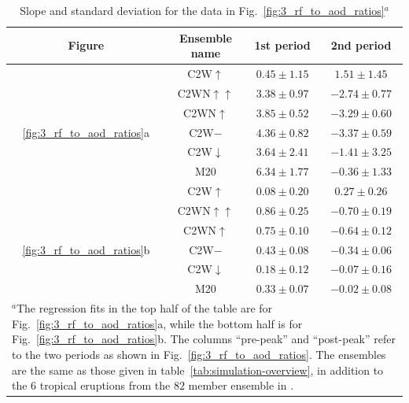 \documentclass[draft]{agujournal2019}
\newcommand{\cwm}{C2W\(\downarrow\)}
\newcommand{\cwmp}{C2W\(-\)}
\newcommand{\cws}{C2WN\(\uparrow\)}
\newcommand{\cwss}{C2WN\(\uparrow\uparrow\)}
\newcommand{\cwsn}{C2W\(\uparrow\)}
\begin{document}
\begin{table}
  \centering

  \caption{Slope and standard deviation for the data in
    Fig.~\ref{fig:3_rf_to_aod_ratios}\(^{a}\)}\label{tab:slope-gradients}%
  \begin{tabular}{cccc}
    \toprule
    Figure                        & Ensemble name & 1st period      & 2nd period       \\
    \midrule
                                  & \cwsn{}       & \(0.45\pm1.15\) & \(1.51\pm1.45\)  \\
                                  & \cwss{}       & \(3.38\pm0.97\) & \(-2.74\pm0.77\) \\
                                  & \cws{}        & \(3.85\pm0.52\) & \(-3.29\pm0.60\) \\
    \ref{fig:3_rf_to_aod_ratios}a & \cwmp{}       & \(4.36\pm0.82\) & \(-3.37\pm0.59\) \\
                                  & \cwm{}        & \(3.64\pm2.41\) & \(-1.41\pm3.25\) \\
                                  & M20           & \(6.34\pm1.77\) & \(-0.36\pm1.33\) \\
    \midrule
                                  & \cwsn{}       & \(0.08\pm0.20\) & \(0.27\pm0.26\)  \\
                                  & \cwss{}       & \(0.86\pm0.25\) & \(-0.70\pm0.19\) \\
                                  & \cws{}        & \(0.75\pm0.10\) & \(-0.64\pm0.12\) \\
    \ref{fig:3_rf_to_aod_ratios}b & \cwmp{}       & \(0.43\pm0.08\) & \(-0.34\pm0.06\) \\
                                  & \cwm{}        & \(0.18\pm0.12\) & \(-0.07\pm0.16\) \\
                                  & M20           & \(0.33\pm0.07\) & \(-0.02\pm0.08\) \\
    \toprule
    \multicolumn{4}{l}{\parbox{\linewidth}{\(^{a}\)The regression fits in the top half of the table are for
        Fig.~\ref{fig:3_rf_to_aod_ratios}a, while the bottom half is for
        Fig.~\ref{fig:3_rf_to_aod_ratios}b. The columns ``pre-peak'' and ``post-peak'' refer to
        the two periods as shown in Fig.~\ref{fig:3_rf_to_aod_ratios}. The ensembles are the
        same as those given in table~\ref{tab:simulation-overview}, in addition to the \(6\)
        tropical eruptions from the \(82\) member ensemble in
    .}}                                                            \\
  \end{tabular}
\end{table}
\end{document}

